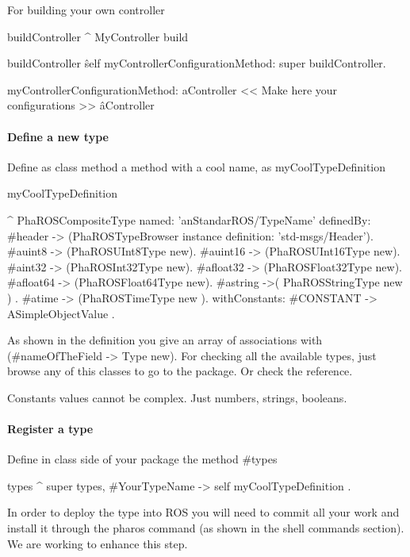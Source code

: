 \documentclass[a4paper,10pt,twoside]{book}
\begin{document}
	For building your own controller 
	
	
	
	\begin{code}
	buildController
		^ MyController build	
		
	buildController
		\^ self myControllerConfigurationMethod: super buildController.
	
	myControllerConfigurationMethod: aController
		<< Make here your configurations >>
		\^ aController
		
	\end{code}
	
	
	\paragraph{Define a new type \newline}
	
	
	Define as class method a method with a cool name, as myCoolTypeDefinition
	
	
	\begin{code}
	myCoolTypeDefinition
	
	^ PhaROSCompositeType named: 'anStandarROS/TypeName' definedBy: {
		#header -> (PhaROSTypeBrowser instance definition: 'std-msgs/Header'). 
		#auint8 -> (PhaROSUInt8Type new).
		#auint16 -> (PhaROSUInt16Type new).
		#aint32 -> (PhaROSInt32Type new).
		#afloat32 -> (PhaROSFloat32Type new).
		#afloat64 -> (PhaROSFloat64Type new).
		#astring ->( PhaROSStringType new ) .
		#atime -> (PhaROSTimeType new ). 
	}  withConstants: {
		#CONSTANT -> ASimpleObjectValue
	}.
	\end{code}
	As shown in the definition you give an array of associations with (\#nameOfTheField -> Type new). 
	For checking all the available types, just browse any of this classes to go to the package. Or check the reference.
	
	Constants values cannot be complex. Just numbers, strings, booleans. 
	
	
	\paragraph{Register a type \newline}


	Define in class side of your package the method \#types 

	\begin{code}
	types
		^ super types, { #YourTypeName -> self myCoolTypeDefinition }.
	
	\end{code}
	In order to deploy the type into ROS you will need to commit all your work and install it through the pharos command (as shown in the shell commands section). 
	We are working to enhance this step. 
	
\end{document}
